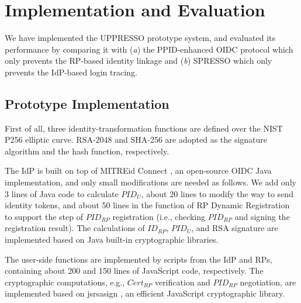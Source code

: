 \section{Implementation and Evaluation}
\label{sec:implementation}
We have implemented the UPPRESSO prototype system, and evaluated its performance
 by comparing it with (\emph{a}) the PPID-enhanced OIDC protocol \cite{MITREid}
    which only prevents the RP-based identity linkage
     and (\emph{b}) SPRESSO \cite{SPRESSO} which only prevents the IdP-based login tracing.

\subsection{Prototype Implementation}
First of all, three identity-transformation functions are defined over
        the NIST P256 elliptic curve.
RSA-2048 and SHA-256 are adopted as the signature algorithm and the hash function, respectively.

The IdP is built on top of MITREid Connect \cite{MITREid},
    an open-source OIDC Java implementation, %
    and only small modifications are needed as follows.
We add only 3 lines of Java code to calculate $PID_U$,
     about 20 lines to modify the way to send identity tokens,
    and about 50 lines in the function of RP Dynamic Registration to support the step of $PID_{RP}$ registration
            (i.e., checking $PID_{RP}$ and signing the registration result).
The calculations of $ID_{RP}$, $PID_U$, and RSA signature are implemented based on Java built-in cryptographic libraries. %

The user-side functions are implemented by scripts from the IdP and RPs,
     containing about 200 and 150 lines of JavaScript code, respectively.
The cryptographic computations, e.g., $Cert_{RP}$ verification and $PID_{RP}$ negotiation, are implemented based on jsrsasign \cite{jsrsasign}, an efficient JavaScript cryptographic library.

